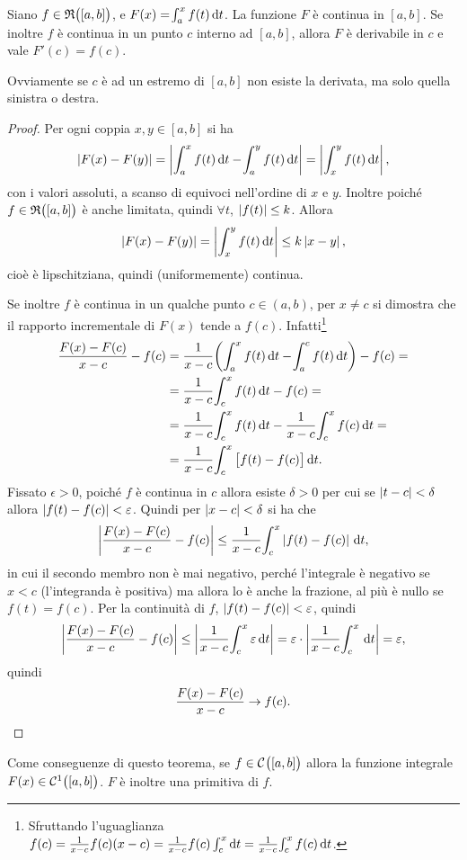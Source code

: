 \begin{teorema} \label{t:tfci1}
Siano $f\in\mathfrak{R}\big([a,b]\big)$, e $F(x)=\!\int_a^xf(t)\,\textup{d} t$.
La funzione $F$ è continua in $[a,b]$. Se inoltre $f$ è continua in un punto $c$ interno ad $[a,b]$, allora $F$ è derivabile in $c$ e vale $F'(c)=f(c)$.
\end{teorema}
Ovviamente se $c$ è ad un estremo di $[a,b]$ non esiste la derivata, ma solo quella sinistra o destra.
\begin{proof}
Per ogni coppia $x,y\in[a,b]$ si ha
\[
\left|{F(x)-F(y)}\right|=\left|{\int_a^xf(t)\,\textup{d} t-\!\int_a^yf(t)\,\textup{d} t}\right|=\left|{\int_x^yf(t)\,\textup{d} t}\right|,
\]
con i valori assoluti, a scanso di equivoci nell'ordine di $x$ e $y$. Inoltre poiché $f\in\mathfrak{R}\big([a,b]\big)$ è anche limitata, quindi $\forall t$, $\left|{f(t)}\right|\leq k$. Allora
\[
\left|{F(x)-F(y)}\right|=\left|{\int_x^yf(t)\,\textup{d} t}\right|\leq k\left|{x-y}\right|,
\]
cioè è lipschitziana, quindi (uniformemente) continua.

Se inoltre $f$ è continua in un qualche punto $c\in(a,b)$, per $x\neq c$ si dimostra che il rapporto incrementale di $F(x)$ tende a $f(c)$. Infatti\footnote{Sfruttando l'uguaglianza $f(c)=\frac1{x-c}f(c)(x-c)=\frac1{x-c}f(c)\int_c^x\textup{d} t=\frac1{x-c}\!\int_c^xf(c)\,\textup{d} t$.}
\[
\begin{split}
\frac{F(x)-F(c)}{x-c}-f(c)	&=\frac1{x-c}\bigg(\!\int_a^xf(t)\,\textup{d} t-\!\int_a^cf(t)\,\textup{d} t\bigg)-f(c)=\\
						&=\frac1{x-c}\!\int_c^xf(t)\,\textup{d} t-f(c)=\\
						&=\frac1{x-c}\!\int_c^xf(t)\,\textup{d} t-\frac1{x-c}\!\int_c^xf(c)\,\textup{d} t=\\
						&=\frac1{x-c}\!\int_c^x\big[f(t)-f(c)\big]\,\textup{d} t.
\end{split}
\]
Fissato $\epsilon>0$, poiché $f$ è continua in $c$ allora esiste $\delta>0$ per cui se $\left|{t-c}\right|<\delta$ allora $\left|{f(t)-f(c)}\right|<\varepsilon$. Quindi per $\left|{x-c}\right|<\delta$ si ha che
\[
\left|{\frac{F(x)-F(c)}{x-c}-f(c)}\right|\leq\frac1{x-c}\!\int_c^x\left|{f(t)-f(c)}\right|\,\textup{d} t,
\]
in cui il secondo membro non è mai negativo, perché l'integrale è negativo se $x<c$ (l'integranda è positiva) ma allora lo è anche la frazione, al più è nullo se $f(t)=f(c)$.
Per la continuità di $f$, $\left|{f(t)-f(c)}\right|<\varepsilon$, quindi
\[
\left|{\frac{F(x)-F(c)}{x-c}-f(c)}\right|\leq\left|{\frac1{x-c}\!\int_c^x\varepsilon\,\textup{d} t}\right|=\varepsilon\cdot\left|{\frac1{x-c}\!\int_c^x\,\textup{d} t}\right|=\varepsilon,
\]
quindi
\[
\frac{F(x)-F(c)}{x-c}\to f(c).\qedhere
\]
\end{proof}
Come conseguenze di questo teorema, se $f\in\mathcal{C}^{{}}\big([a,b]\big)$ allora la funzione integrale $F(x)\in\mathcal{C}^{{1}}\big([a,b]\big)$. $F$ è inoltre una primitiva di $f$.
